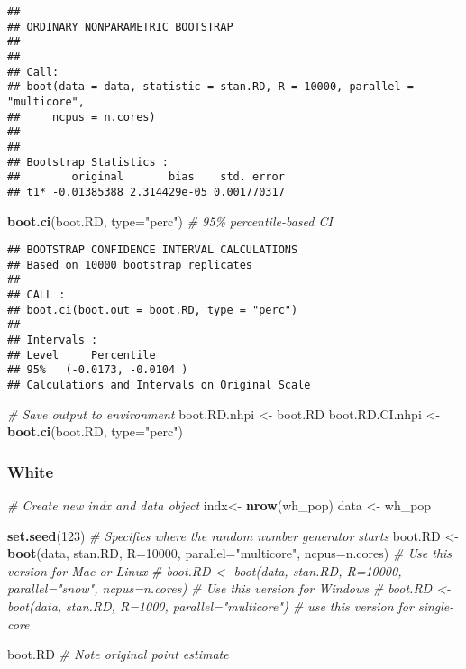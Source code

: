 \documentclass[
]{article}
\newenvironment{Shaded}{\begin{snugshade}}{\end{snugshade}}
\newcommand{\AttributeTok}[1]{\textcolor[rgb]{0.13,0.29,0.53}{#1}}
\newcommand{\CommentTok}[1]{\textcolor[rgb]{0.56,0.35,0.01}{\textit{#1}}}
\newcommand{\DecValTok}[1]{\textcolor[rgb]{0.00,0.00,0.81}{#1}}
\newcommand{\FunctionTok}[1]{\textcolor[rgb]{0.13,0.29,0.53}{\textbf{#1}}}
\newcommand{\NormalTok}[1]{#1}
\newcommand{\OtherTok}[1]{\textcolor[rgb]{0.56,0.35,0.01}{#1}}
\newcommand{\StringTok}[1]{\textcolor[rgb]{0.31,0.60,0.02}{#1}}
\begin{document}
\begin{verbatim}
## 
## ORDINARY NONPARAMETRIC BOOTSTRAP
## 
## 
## Call:
## boot(data = data, statistic = stan.RD, R = 10000, parallel = "multicore", 
##     ncpus = n.cores)
## 
## 
## Bootstrap Statistics :
##        original       bias    std. error
## t1* -0.01385388 2.314429e-05 0.001770317
\end{verbatim}

\begin{Shaded}
\begin{Highlighting}[]
\FunctionTok{boot.ci}\NormalTok{(boot.RD, }\AttributeTok{type=}\StringTok{"perc"}\NormalTok{) }\CommentTok{\# 95\% percentile{-}based CI}
\end{Highlighting}
\end{Shaded}

\begin{verbatim}
## BOOTSTRAP CONFIDENCE INTERVAL CALCULATIONS
## Based on 10000 bootstrap replicates
## 
## CALL : 
## boot.ci(boot.out = boot.RD, type = "perc")
## 
## Intervals : 
## Level     Percentile     
## 95%   (-0.0173, -0.0104 )  
## Calculations and Intervals on Original Scale
\end{verbatim}

\begin{Shaded}
\begin{Highlighting}[]
\CommentTok{\# Save output to environment}
\NormalTok{boot.RD.nhpi }\OtherTok{\textless{}{-}}\NormalTok{ boot.RD}
\NormalTok{boot.RD.CI.nhpi }\OtherTok{\textless{}{-}} \FunctionTok{boot.ci}\NormalTok{(boot.RD, }\AttributeTok{type=}\StringTok{"perc"}\NormalTok{)}
\end{Highlighting}
\end{Shaded}

\subsubsection{White}\label{white}

\begin{Shaded}
\begin{Highlighting}[]
\CommentTok{\# Create new indx and data object }
\NormalTok{indx}\OtherTok{\textless{}{-}} \FunctionTok{nrow}\NormalTok{(wh\_pop)}
\NormalTok{data }\OtherTok{\textless{}{-}}\NormalTok{ wh\_pop}

\FunctionTok{set.seed}\NormalTok{(}\DecValTok{123}\NormalTok{) }\CommentTok{\# Specifies where the random number generator starts}
\NormalTok{boot.RD }\OtherTok{\textless{}{-}} \FunctionTok{boot}\NormalTok{(data, stan.RD, }\AttributeTok{R=}\DecValTok{10000}\NormalTok{, }\AttributeTok{parallel=}\StringTok{"multicore"}\NormalTok{, }\AttributeTok{ncpus=}\NormalTok{n.cores) }\CommentTok{\# Use this version for Mac or Linux}
\CommentTok{\# boot.RD \textless{}{-} boot(data, stan.RD, R=10000, parallel="snow", ncpus=n.cores) \# Use this version for Windows}
\CommentTok{\# boot.RD \textless{}{-} boot(data, stan.RD, R=1000, parallel="multicore") \# use this version for single{-}core}

\NormalTok{boot.RD }\CommentTok{\# Note original point estimate}
\end{Highlighting}
\end{Shaded}
\end{document}
